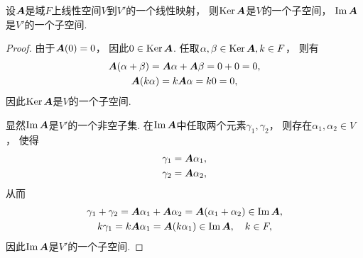 \begin{proposition}\label{theorem:线性映射.线性映射的核空间和像空间分别是定义域和陪域的子空间}
设\(\boldsymbol{A}\)是域\(F\)上线性空间\(V\)到\(V'\)的一个线性映射，
则\(\operatorname{Ker}\boldsymbol{A}\)是\(V\)的一个子空间，
\(\operatorname{Im}\boldsymbol{A}\)是\(V'\)的一个子空间.
\begin{proof}
由于\(\boldsymbol{A}(0)=0\)，
因此\(0 \in \operatorname{Ker}\boldsymbol{A}\).
任取\(\alpha,\beta \in \operatorname{Ker}\boldsymbol{A},
k \in F\)，
则有\begin{gather*}
	\boldsymbol{A}(\alpha+\beta)
	= \boldsymbol{A}\alpha + \boldsymbol{A}\beta
	= 0 + 0
	= 0, \\
	\boldsymbol{A}(k\alpha)
	= k \boldsymbol{A}\alpha
	= k0
	= 0,
\end{gather*}
因此\(\operatorname{Ker}\boldsymbol{A}\)是\(V\)的一个子空间.

显然\(\operatorname{Im}\boldsymbol{A}\)是\(V'\)的一个非空子集.
在\(\operatorname{Im}\boldsymbol{A}\)中任取两个元素\(\gamma_1,\gamma_2\)，
则存在\(\alpha_1,\alpha_2 \in V\)，
使得\begin{gather*}
	\gamma_1 = \boldsymbol{A}\alpha_1, \\
	\gamma_2 = \boldsymbol{A}\alpha_2,
\end{gather*}
从而\begin{gather*}
	\gamma_1 + \gamma_2
	= \boldsymbol{A}\alpha_1 + \boldsymbol{A}\alpha_2
	= \boldsymbol{A}(\alpha_1 + \alpha_2)
	\in \operatorname{Im}\boldsymbol{A}, \\
	k \gamma_1
	= k \boldsymbol{A}\alpha_1
	= \boldsymbol{A}(k \alpha_1)
	\in \operatorname{Im}\boldsymbol{A},
	\quad k \in F,
\end{gather*}
因此\(\operatorname{Im}\boldsymbol{A}\)是\(V'\)的一个子空间.
\end{proof}
\end{proposition}

